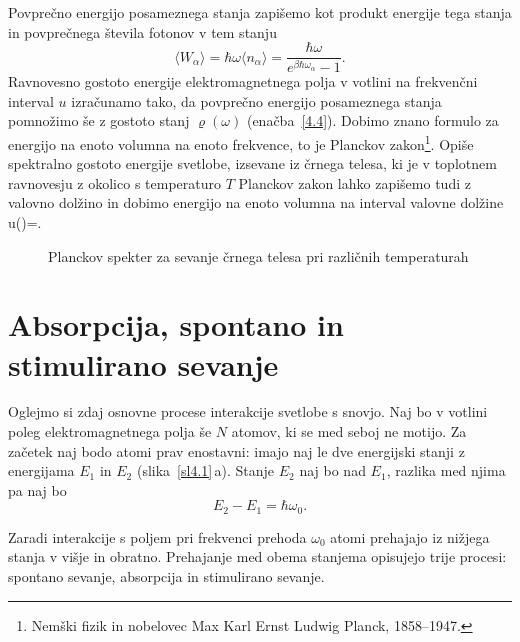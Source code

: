 Povprečno energijo posameznega stanja zapišemo kot produkt energije tega stanja in 
povprečnega števila fotonov v tem stanju
\begin{equation}
\langle W_{\alpha}\rangle = \hbar \omega \langle n_\alpha \rangle
= \frac{\hbar \omega}{e^{\beta\hbar\omega_{\alpha}}-1}.
\end{equation}
Ravnovesno gostoto energije elektromagnetnega polja v votlini na
frekvenčni interval $u$ izračunamo tako, da povprečno energijo posameznega
stanja pomnožimo še z gostoto stanj $\varrho (\omega)$ 
(enačba~\ref{4.4}). Dobimo znano formulo za energijo na enoto volumna na enoto frekvence, 
to je Planckov 
zakon\footnote{Nemški fizik in nobelovec Max Karl Ernst Ludwig Planck, 1858--1947.}.
Opiše spektralno gostoto energije svetlobe, izsevane iz 
črnega telesa, ki je v toplotnem ravnovesju z 
okolico s temperaturo $T$
Planckov zakon lahko zapišemo tudi z valovno dolžino in dobimo energijo na enoto volumna
na interval valovne dolžine
\beq
u(\lambda)=.
\eeq

\begin{figure}[h]
\centering
\def\svgwidth{100truemm} 

\caption{Planckov spekter za sevanje črnega telesa pri različnih temperaturah}
\label{fig:Planck}
\end{figure}

\section{Absorpcija, spontano in stimulirano sevanje}
Oglejmo si zdaj osnovne procese interakcije svetlobe s snovjo. Naj
bo v votlini poleg elektromagnetnega polja še $N$ atomov, ki se med
seboj ne motijo. Za začetek naj bodo atomi prav enostavni:
imajo naj le dve energijski stanji z energijama $E_{1}$ in $E_{2}$ (slika~\ref{sl4.1}\,a). 
Stanje $E_2$ naj bo nad $E_1$, razlika med njima pa naj bo
\begin{equation}
 E_2 - E_1 = \hbar \omega_0.
\end{equation}

Zaradi interakcije s poljem pri frekvenci prehoda $\omega_{0}$
atomi prehajajo iz nižjega stanja v višje in obratno. Prehajanje 
med obema stanjema opisujejo trije procesi: 
spontano sevanje, absorpcija in stimulirano sevanje.

